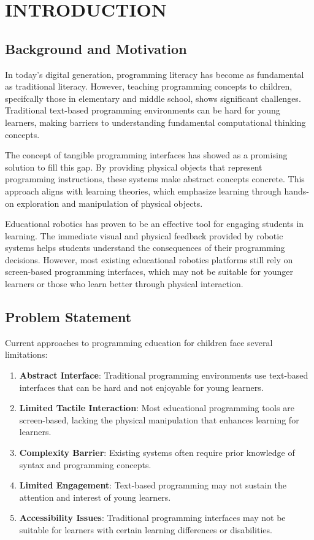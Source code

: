 \chapter{INTRODUCTION}

\section{Background and Motivation}

In today's digital generation, programming literacy has become as fundamental as traditional literacy. However, teaching programming concepts to children, specifcally those in elementary and middle school, shows significant challenges. Traditional text-based programming environments can be hard for young learners, making barriers to understanding fundamental computational thinking concepts.

The concept of tangible programming interfaces has showed as a promising solution to fill this gap. By providing physical objects that represent programming instructions, these systems make abstract concepts concrete. This approach aligns with learning theories, which emphasize learning through hands-on exploration and manipulation of physical objects.

Educational robotics has proven to be an effective tool for engaging students in learning. The immediate visual and physical feedback provided by robotic systems helps students understand the consequences of their programming decisions. However, most existing educational robotics platforms still rely on screen-based programming interfaces, which may not be suitable for younger learners or those who learn better through physical interaction.

\section{Problem Statement}

Current approaches to programming education for children face several limitations:

\begin{enumerate}
    \item \textbf{Abstract Interface}: Traditional programming environments use text-based interfaces that can be hard and not enjoyable for young learners.
    \item \textbf{Limited Tactile Interaction}: Most educational programming tools are screen-based, lacking the physical manipulation that enhances learning for  learners.
    \item \textbf{Complexity Barrier}: Existing systems often require prior knowledge of syntax and programming concepts.
    \item \textbf{Limited Engagement}: Text-based programming may not sustain the attention and interest of young learners.
    \item \textbf{Accessibility Issues}: Traditional programming interfaces may not be suitable for learners with certain learning differences or disabilities.
\end{enumerate}

